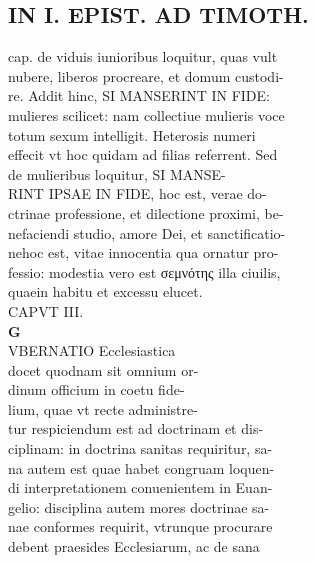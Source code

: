 \documentclass{article}
\begin{document}
\begin{pages}
\section*{IN I. EPIST. AD TIMOTH. \\
                }
cap. de viduis iunioribus loquitur, quas vult \\
                nubere, liberos procreare, et domum custodi- \\
                re. Addit hinc, SI MANSERINT IN FIDE: \\
                mulieres scilicet: nam collectiue mulieris voce \\
                totum sexum intelligit. Heterosis numeri \\
                effecit vt hoc quidam ad filias referrent. Sed \\
                de mulieribus loquitur, SI MANSE- \\
                RINT IPSAE IN FIDE, hoc est, verae do- \\
                ctrinae professione, et dilectione proximi, be- \\
                nefaciendi studio, amore Dei, et sanctificatio- \\
                nehoc est, vitae innocentia qua ornatur pro- \\
                fessio: modestia vero est σεμνότης illa ciuilis, \\
                quaein habitu et excessu elucet. \\
                CAPVT III. \\
                
\textbf{G \\
                }VBERNATIO Ecclesiastica \\
                docet quodnam sit omnium or- \\
                dinum officium in coetu fide- \\
                lium, quae vt recte administre- \\
                tur respiciendum est ad doctrinam et dis- \\
                ciplinam: in doctrina sanitas requiritur, sa- \\
                na autem est quae habet congruam loquen- \\
                di interpretationem conuenientem in Euan- \\
                gelio: disciplina autem mores doctrinae sa- \\
                nae conformes requirit, vtrunque procurare \\
                debent praesides Ecclesiarum, ac de sana \\
                

\end{pages}
\end{document}
